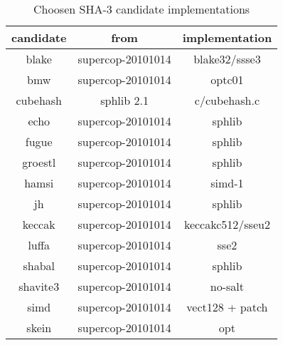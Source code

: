 \begin{table}
  \centering
  \begin{tabular}{ | c | c | c | }
    \hline
    \textbf{candidate} & \textbf{from} & \textbf{implementation} \\ \hline
     blake      & supercop-20101014 & blake32/ssse3 \\ \hline
     bmw        & supercop-20101014 & optc01        \\ \hline
     cubehash   & sphlib 2.1        & c/cubehash.c  \\ \hline
     echo       & supercop-20101014 & sphlib        \\ \hline
     fugue      & supercop-20101014 & sphlib        \\ \hline
     groestl    & supercop-20101014 & sphlib        \\ \hline
     hamsi      & supercop-20101014 & simd-1        \\ \hline
     jh         & supercop-20101014 & sphlib        \\ \hline
     keccak     & supercop-20101014 & keccakc512/sseu2 \\ \hline
     luffa      & supercop-20101014 & sse2          \\ \hline
     shabal     & supercop-20101014 & sphlib        \\ \hline
     shavite3   & supercop-20101014 & no-salt       \\ \hline
     simd       & supercop-20101014 & vect128 + patch \\ \hline
     skein      & supercop-20101014 & opt           \\ \hline
  \end{tabular}
  \caption{Choosen \ac{SHA}-3 candidate implementations}
  \label{tbl:sha3:implementations}
\end{table}
